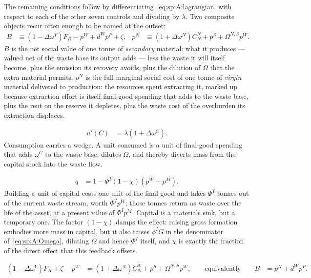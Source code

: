 The remaining conditions follow by differentiating~\eqref{eq:sp:A:lagrangian} with respect to each of
the other seven controls and dividing by $\lambda$. Two composite objects recur often enough to be
named at the outset:
\begin{align}
B &\equiv \left(1-\Delta\omega^Y\right)F_R-p^W+d^Wp^P+\zeta,
&
p^N &\equiv \left(1+\Delta\omega^N\right)C^N_N+p^S+\Omega^{N,S}p^W .
\label{eq:sp:A:Bvalue}
\end{align}
$B$ is the net social value of one tonne of \emph{secondary} material: what it produces
--- valued net of the waste base its output adds --- less the waste it will itself become, plus the
emission its recovery avoids, plus the dilution of $\Omega$ that the extra material permits.
$p^N$ is the full marginal social cost of one tonne of \emph{virgin} material delivered
to production: the resources spent extracting it, marked up because extraction effort is itself
final-good spending that adds to the waste base, plus the rent on the reserve it depletes, plus the
waste cost of the overburden its extraction displaces.

\begin{align}
u'\!\left(C\right) &= \lambda\left(1+\Delta\omega^C\right).
\label{eq:sp:A:foc:C}
\end{align}
Consumption carries a wedge. A unit consumed is a unit of final-good spending that adds $\omega^C$ to
the waste base, dilutes $\Omega$, and thereby diverts mass from the capital stock into the waste flow.

\begin{align}
q &= 1-\Phi^I\left(1-\chi\right)\left(p^W-p^M\right).
\label{eq:sp:A:foc:I}
\end{align}
Building a unit of capital costs one unit of the final good and takes $\Phi^I$ tonnes out of the
current waste stream, worth $\Phi^Ip^W$; those tonnes return as waste over the life of the asset, at a
present value of $\Phi^Ip^M$. Capital is a materials sink, but a temporary one. The factor
$\left(1-\chi\right)$ damps the effect: raising gross formation embodies more mass in capital, but it
also raises $\phi^IG$ in the denominator of~\eqref{eq:sp:A:Omega}, diluting $\Omega$ and hence
$\Phi^I$ itself, and $\chi$ is exactly the fraction of the direct effect that this feedback offsets.

\begin{align}
\left(1-\Delta\omega^Y\right)F_R+\zeta-p^W &= \left(1+\Delta\omega^N\right)C^N_N+p^S+\Omega^{N,S}p^W,
\qquad\text{equivalently}\qquad
B &= p^N+d^Wp^P .
\label{eq:sp:A:foc:N}
\end{align}

